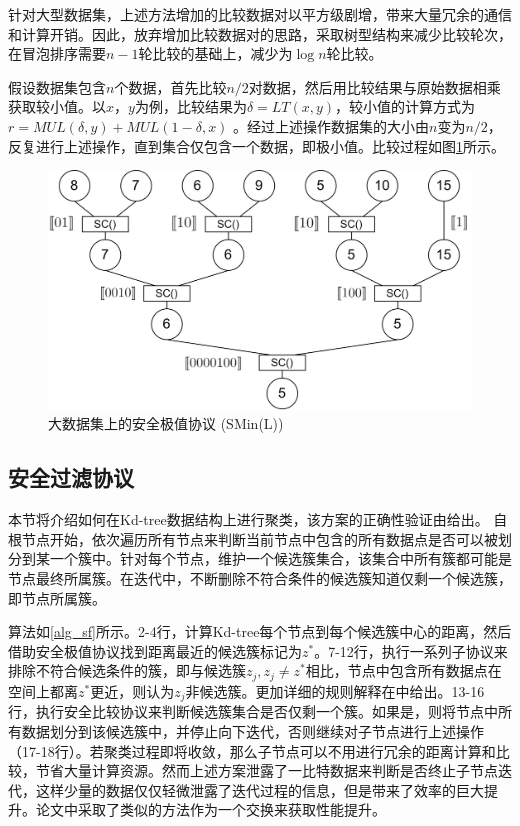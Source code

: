 针对大型数据集，上述方法增加的比较数据对以平方级剧增，带来大量冗余的通信和计算开销。因此，放弃增加比较数据对的思路，采取树型结构来减少比较轮次，在冒泡排序需要$n-1$轮比较的基础上，减少为$\log n$轮比较。

假设数据集包含$n$个数据，首先比较$n/2$对数据，然后用比较结果与原始数据相乘获取较小值。以$x$，$y$为例，比较结果为$\delta = LT(x,y) $，较小值的计算方式为$r=MUL(\delta, y) + MUL(1-\delta, x)$ 。经过上述操作数据集的大小由$n$变为$n/2$，反复进行上述操作，直到集合仅包含一个数据，即极小值。比较过程如图\ref{sminl}所示。

\begin{figure}[htbp]
	\centering
	\includegraphics[scale=0.09]{img/fig1.png}%
	\caption{大数据集上的安全极值协议 (SMin(L))}
	\label{sminl}
\end{figure}

\subsection{安全过滤协议}
本节将介绍如何在Kd-tree数据结构上进行聚类，该方案的正确性验证由\cite{kanungo2002efficient}给出。
自根节点开始，依次遍历所有节点来判断当前节点中包含的所有数据点是否可以被划分到某一个簇中。针对每个节点，维护一个候选簇集合，该集合中所有簇都可能是节点最终所属簇。在迭代中，不断删除不符合条件的候选簇知道仅剩一个候选簇，即节点所属簇。

算法如\ref{alg_sf}所示。2-4行，计算Kd-tree每个节点到每个候选簇中心的距离，然后借助安全极值协议找到距离最近的候选簇标记为$z^*$。7-12行，执行一系列子协议来排除不符合候选条件的簇，即与候选簇$z_j,z_j\neq z^*$相比，节点中包含所有数据点在空间上都离$z^*$更近，则认为$z_j$非候选簇。更加详细的规则解释在\cite{kanungo2002efficient}中给出。13-16行，执行安全比较协议来判断候选簇集合是否仅剩一个簇。如果是，则将节点中所有数据划分到该候选簇中，并停止向下迭代，否则继续对子节点进行上述操作（17-18行）。若聚类过程即将收敛，那么子节点可以不用进行冗余的距离计算和比较，节省大量计算资源。然而上述方案泄露了一比特数据来判断是否终止子节点迭代，这样少量的数据仅仅轻微泄露了迭代过程的信息，但是带来了效率的巨大提升。论文\cite{bozdemir2021privacy,boldyreva2021privacy}中采取了类似的方法作为一个交换来获取性能提升。

